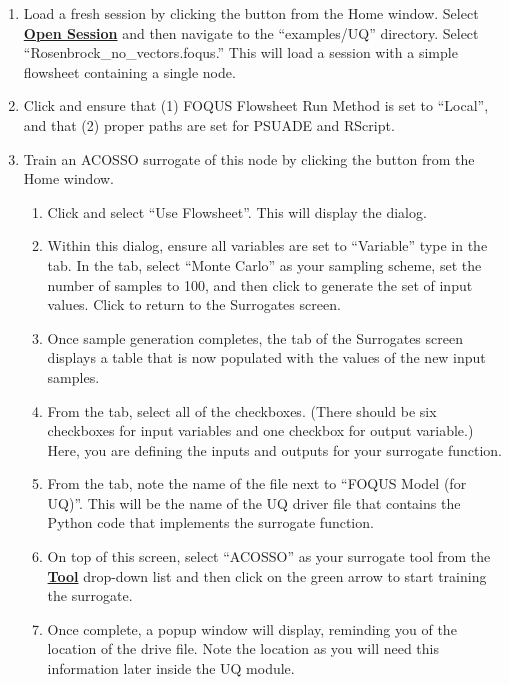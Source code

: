 \begin{enumerate}
\item{Load a fresh session by clicking the  button from the Home window. Select \textbf{\underline{Open Session}} and then navigate to the ``examples/UQ''
  directory. Select ``Rosenbrock\_no\_vectors.foqus.'' This will load a
  session with a simple flowsheet containing a single node.}
\item{Click  and ensure that (1) FOQUS Flowsheet Run Method is
  set to ``Local'', and that (2) proper paths are set for PSUADE and RScript.} 
\item{Train an ACOSSO surrogate of this node by clicking the
   button from the Home window.
\begin{enumerate}
\item{Click  and select ``Use Flowsheet''. This will
  display the  dialog.}
\item{Within this dialog, ensure all variables are set to ``Variable''
  type in the  tab. In the  tab,
  select ``Monte Carlo'' as your sampling scheme, set the number of
  samples to 100, and then click  to generate the
  set of input values. Click  to return to the Surrogates screen.}
\item{Once sample generation completes, the  tab of the Surrogates
  screen displays a  table that is now populated with
  the values of the new input samples.}
\item{From the  tab, select all of the checkboxes. (There should
  be six checkboxes for input variables and one checkbox for output variable.) 
  Here, you are defining the inputs and outputs for your surrogate function.}
\item{From the  tab, note the name of the file next to
  ``FOQUS Model (for UQ)''. This will be the name of the UQ driver file
  that contains the Python code that implements the surrogate function.}
\item{On top of this screen, select ``ACOSSO'' as your surrogate tool from the \textbf{\underline{Tool}} drop-down list and then click on the green arrow to start training the surrogate.}
\item{Once complete, a popup window will display, reminding you of the
  location of the drive file. Note the location as you will need this
  information later inside the UQ module.} 
\end{enumerate}
}
\end{enumerate}

